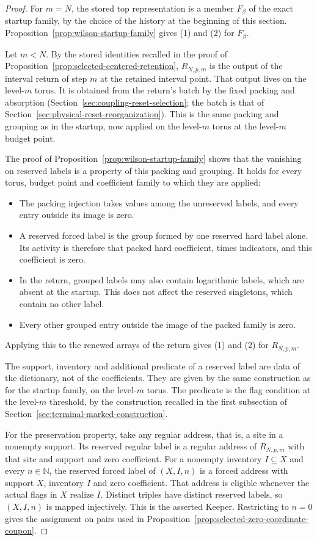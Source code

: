 \begin{proof}
For $m=N$, the stored top representation is a member $F_\beta$ of the
exact startup family, by the choice of the history at the beginning of
this section. Proposition~\ref{prop:wilson-startup-family} gives (1)
and (2) for $F_\beta$.

Let $m<N$. By the stored identities recalled in the proof of
Proposition~\ref{prop:selected-centered-retention}, $R_{N,p,m}$ is the
output of the interval return of step $m$ at the retained interval
point. That output lives on the level-$m$ torus. It is obtained from
the return's batch by the fixed packing and absorption
(Section~\ref{sec:coupling-reset-selection}; the batch is that of
Section~\ref{sec:physical-reset-reorganization}). This is the same
packing and grouping as in the startup, now applied on the level-$m$
torus at the level-$m$ budget point.

The proof of Proposition~\ref{prop:wilson-startup-family} shows that the
vanishing on reserved labels is a property of this packing and
grouping. It holds for every torus, budget point and coefficient family
to which they are applied:
\begin{itemize}
\item The packing injection takes values among the unreserved labels,
  and every entry outside its image is zero.
\item A reserved forced label is the group formed by one reserved hard
  label alone. Its activity is therefore that packed hard coefficient,
  times indicators, and this coefficient is zero.
\item In the return, grouped labels may also contain logarithmic labels,
  which are absent at the startup. This does not affect the reserved
  singletons, which contain no other label.
\item Every other grouped entry outside the image of the packed family
  is zero.
\end{itemize}
Applying this to the renewed arrays of the return gives (1) and (2) for
$R_{N,p,m}$.

The support, inventory and additional predicate of a reserved label
are data of the dictionary, not of the coefficients. They are given by
the same construction as for the startup family, on the level-$m$ torus.
The predicate is the flag condition at the level-$m$ threshold, by the
construction recalled in the first subsection of
Section~\ref{sec:terminal-marked-construction}.

For the preservation property, take any regular address, that is, a
site in a nonempty support. Its reserved regular label is a regular
address of $R_{N,p,m}$ with that site and support and zero coefficient.
For a nonempty inventory $I\subseteq X$ and every $n\in\mathbb N$, the
reserved forced label of $(X,I,n)$ is a forced address with support $X$,
inventory $I$ and zero coefficient. That address is eligible whenever
the actual flags in $X$ realize $I$. Distinct triples have distinct
reserved labels, so $(X,I,n)$ is mapped injectively. This is the
asserted Keeper. Restricting to $n=0$ gives the assignment on pairs used
in Proposition~\ref{prop:selected-zero-coordinate-coupon}.
\end{proof}

